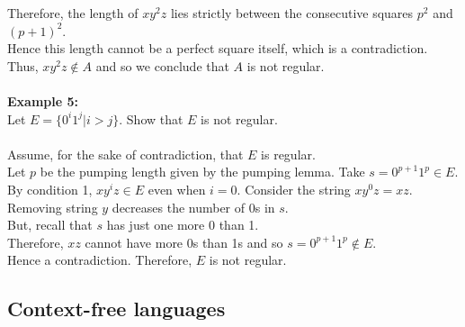 \documentclass[11pt]{article}
\begin{document}
Therefore, the length of $xy^2z$ lies strictly between the consecutive squares $p^2$ and $(p+1)^2$.\\
Hence this length cannot be a perfect square itself, which is a contradiction.\\
Thus, $xy^2z\not\in A$ and so we conclude that $A$ is not regular.
\\\\
\textbf{Example 5:}\\
Let $E=\{0^i1^j|i>j\}$. Show that $E$ is not regular.
\\\\
Assume, for the sake of contradiction, that $E$ is regular.\\
Let $p$ be the pumping length given by the pumping lemma. Take $s=0^{p+1}1^p\in E$.\\
By condition 1, $xy^iz\in E$ even when $i=0$. Consider the string $xy^0z=xz$.\\
Removing string $y$ decreases the number of 0s in $s$.\\
But, recall that $s$ has just one more 0 than 1.\\
Therefore, $xz$ cannot have more 0s than 1s and so $s=0^{p+1}1^p\not\in E$. \\
Hence a contradiction. Therefore, $E$ is not regular.
\subsection{Context-free languages}
\end{document}
